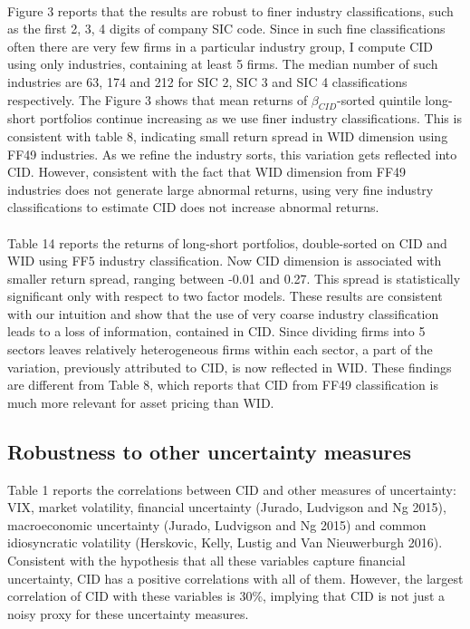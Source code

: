\documentclass[12pt]{article}
\begin{document}
\paragraph{}
Figure 3 reports that the results are robust to finer industry classifications, such as the first 2, 3, 4 digits of company SIC code. Since in such fine classifications often there are very few firms in a particular industry group, I compute CID using only industries, containing at least 5 firms. The median number of such industries are 63, 174 and 212 for SIC 2, SIC 3 and SIC 4 classifications respectively. The Figure 3 shows that mean returns of $\beta_{CID}$-sorted quintile long-short portfolios continue increasing as we use finer industry classifications. This is consistent with table 8, indicating small return spread in WID dimension using FF49 industries. As we refine the industry sorts, this variation gets reflected into CID. However, consistent with the fact that WID dimension from FF49 industries does not generate large abnormal returns, using very fine industry classifications to estimate CID does not increase abnormal returns.
\paragraph{}
Table 14 reports the returns of long-short portfolios, double-sorted on CID and WID using FF5 industry classification. Now CID dimension is associated with smaller return spread, ranging between -0.01 and 0.27. This spread is statistically significant only with respect to two factor models. These results are consistent with our intuition and show that the use of very coarse industry classification leads to a loss of information, contained in CID. Since dividing firms into 5 sectors leaves relatively heterogeneous firms within each sector, a part of the variation, previously attributed to CID, is now reflected in WID. These findings are different from Table 8, which reports that CID from FF49 classification is much more relevant for asset pricing than WID. 

\subsection{Robustness to other uncertainty measures}

Table 1 reports the correlations between CID and other measures of uncertainty: VIX, market volatility, financial uncertainty (Jurado, Ludvigson and Ng 2015), macroeconomic uncertainty (Jurado, Ludvigson and Ng 2015) and common idiosyncratic volatility (Herskovic, Kelly, Lustig and Van Nieuwerburgh 2016). Consistent with the hypothesis that all these variables capture financial uncertainty, CID has a positive correlations with all of them. However, the largest correlation of CID with these variables is 30\%, implying that CID is not just a noisy proxy for these uncertainty measures.
\end{document}
